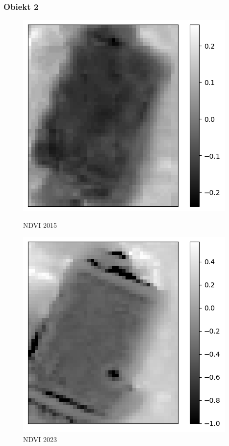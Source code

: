 \documentclass[a4paper,12pt]{article}  %
\begin{document}
\newpage
\subsubsection{Obiekt 2}

\begin{figure}[H]
    \centering
    \begin{minipage}{0.45\textwidth}
        \centering
        \includegraphics[width=\linewidth]{spektralne/ndvi_budynek0_2015.png}
        \caption*{NDVI 2015}
    \end{minipage}
    \begin{minipage}{0.45\textwidth}
        \centering
        \includegraphics[width=\linewidth]{spektralne/ndvi_budynek0_2023.png}
        \caption*{NDVI 2023}
    \end{minipage}
\end{figure}
\end{document}
